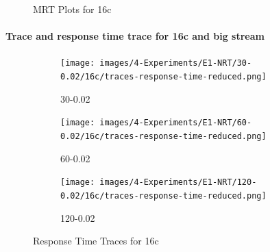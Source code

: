 \documentclass[12pt,a4paper]{article}
\begin{document}
\begin{figure}[H]
    \centering
    
    \vspace{0.5cm} %


    \caption{MRT Plots for 16c}
    \label{img:exps-small-mrt-16c}
\end{figure}

\paragraph{Trace and response time trace for 16c and big stream\\}
\newpage

\begin{figure}[H]
    \centering
    \begin{subfigure}[b]{\textwidth}
        \centering
        \texttt{[image: images/4-Experiments/E1-NRT/30-0.02/16c/traces-response-time-reduced.png]}
        \caption{30-0.02}
    \end{subfigure}
    
    \vspace{0.5cm} %
    \begin{subfigure}[b]{\textwidth}
        \centering
        \texttt{[image: images/4-Experiments/E1-NRT/60-0.02/16c/traces-response-time-reduced.png]}
        \caption{60-0.02}
    \end{subfigure}
    
    \vspace{0.5cm} %
    \begin{subfigure}[b]{\textwidth}
        \centering
        \texttt{[image: images/4-Experiments/E1-NRT/120-0.02/16c/traces-response-time-reduced.png]}
        \caption{120-0.02}
    \end{subfigure}

    \caption{Response Time Traces for 16c}
    \label{img:exps-small-responsetimetraces-16c}
\end{figure}
\end{document}
